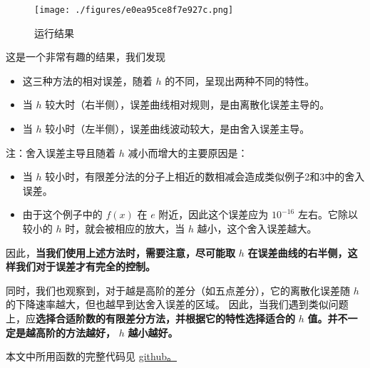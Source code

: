 \begin{figure}[ht]
\centering
\texttt{[image: ./figures/e0ea95ce8f7e927c.png]}
\caption{运行结果} \label{fig_NumErr_2}
\end{figure}

这是一个非常有趣的结果，我们发现

\begin{itemize}
\item 这三种方法的相对误差，随着 $h$  的不同，呈现出两种不同的特性。
\item 当  $h$  较大时（右半侧），误差曲线相对规则，是由离散化误差主导的。
\item 当  $h$  较小时（左半侧），误差曲线波动较大，是由舍入误差主导。
\end{itemize}

注：舍入误差主导且随着 $h$ 减小而增大的主要原因是：
\begin{itemize}
\item 当 $h$ 较小时，有限差分法的分子上相近的数相减会造成类似例子2和3中的舍入误差。
\item 由于这个例子中的  $f(x)$ 在  $e$  附近，因此这个误差应为 $10^{-16}$ 左右。它除以较小的 $h$ 时，就会被相应的放大，当  $h$  越小，这个舍入误差越大。
\end{itemize}

因此，\textbf{当我们使用上述方法时，需要注意，尽可能取}  $h$  \textbf{在误差曲线的右半侧，这样我们对于误差才有完全的控制。}

同时，我们也观察到，对于越是高阶的差分（如五点差分），它的离散化误差随  $h$  的下降速率越大，但也越早到达舍入误差的区域。 因此，当我们遇到类似问题上，应\textbf{选择合适阶数的有限差分方法，并根据它的特性选择适合的}  $h$  \textbf{值。并不一定是越高阶的方法越好，}  $h$  \textbf{越小越好。}

本文中所用函数的完整代码见 \href{https://github.com/enigne/ScientificComputingBridging/blob/master/Lab/L2/measureErrors.py}{github。}
